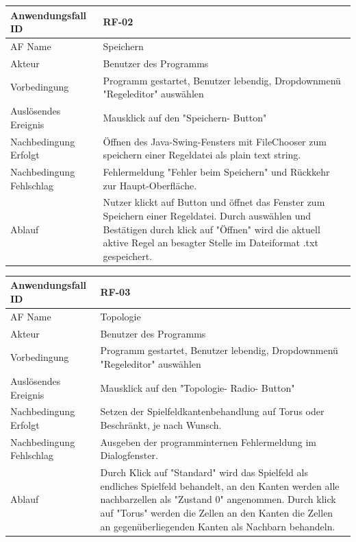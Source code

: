 \documentclass[11pt,a4paper]{article}
\begin{document}
     \begin{tabular}[m]{|m{7cm}|m{9cm}|}
          \hline
          Anwendungsfall ID     & RF-02 \\ %
          \hline
          AF Name     &  Speichern \\
          \hline
          Akteur&Benutzer des Programms \\
          \hline
          Vorbedingung&Programm gestartet, Benutzer lebendig, Dropdownmenü "Regeleditor" auswählen\\
          \hline
          Auslösendes Ereignis&Mausklick auf den "Speichern- Button"\\
          \hline
          Nachbedingung Erfolgt&Öffnen des Java-Swing-Fensters mit FileChooser zum speichern einer Regeldatei als plain text string.\\
          \hline
          Nachbedingung Fehlschlag&Fehlermeldung "Fehler beim Speichern" und Rückkehr zur Haupt-Oberfläche.\\
          \hline
          Ablauf&Nutzer klickt auf Button und öffnet das Fenster zum Speichern einer Regeldatei. Durch auswählen und Bestätigen durch klick auf "Öffnen" wird die aktuell aktive Regel an besagter Stelle im Dateiformat .txt gespeichert.\\
          \hline
     \end{tabular}
     \par

	\begin{tabular}[m]{|m{7cm}|m{9cm}|}
		\hline
		Anwendungsfall ID     & RF-03 \\ %
		\hline
		AF Name     &  Topologie \\
		\hline
		Akteur&Benutzer des Programms \\
		\hline
		Vorbedingung&Programm gestartet, Benutzer lebendig, Dropdownmenü "Regeleditor" auswählen\\
		\hline
		Auslösendes Ereignis&Mausklick auf den "Topologie- Radio- Button"\\
		\hline
		Nachbedingung Erfolgt&Setzen der Spielfeldkantenbehandlung auf Torus oder Beschränkt, je nach Wunsch.\\
		\hline
		Nachbedingung Fehlschlag&Ausgeben der programminternen Fehlermeldung im Dialogfenster.\\
		\hline
		Ablauf&Durch Klick auf "Standard" wird das Spielfeld als endliches Spielfeld behandelt, an den Kanten werden alle nachbarzellen als "Zustand 0" angenommen.
		Durch klick auf "Torus" werden die Zellen an den Kanten die Zellen an gegenüberliegenden Kanten als Nachbarn behandeln.\\
		\hline
	\end{tabular}
	
\end{document}
